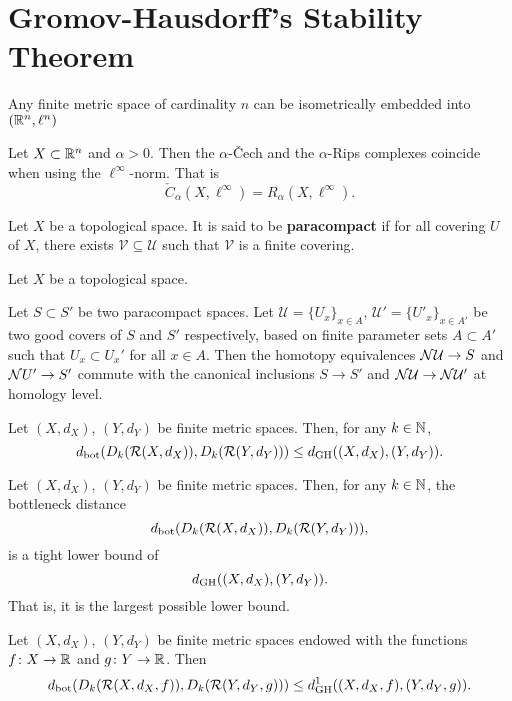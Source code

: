 \chapter{Gromov-Hausdorff's Stability Theorem}

\begin{lemma}
    Any finite metric space of cardinality $ n $ can be isometrically embedded into $(\mathbb R^n, \ell^n)$
\end{lemma}

\begin{lemma}
    Let $ X \subset \mathbb R^n $ and $ \alpha > 0 $. Then the $\alpha$-\v Cech and the $\alpha$-Rips complexes coincide when using the $ \ell^\infty $-norm. That is
    $$
        \check C_\alpha(X, \ell^\infty) = R_\alpha(X, \ell^\infty).
    $$
\end{lemma}

\begin{definition}
    Let $ X $ be a topological space. It is said to be {\bf paracompact} if for all covering $ U $ of $ X $, there exists $ \mathcal V \subseteq \mathcal U $ such that $ \mathcal V $ is a finite covering.
\end{definition}

\begin{definition}
    Let $ X $ be a topological space.
\end{definition}

\begin{lemma}
    Let $ S \subset S' $ be two paracompact spaces. Let $ \mathcal U = \{U_x\}_{x \in A}$, $ \mathcal U' = \{U'_x\}_{x \in A'}$ be two good covers of $ S $ and $ S'$ respectively, based on finite parameter sets $ A \subset A ' $ such that $ U_x \subset U_x' $ for all $ x \in A $. Then the homotopy equivalences $ \mathcal{N} \mathcal U \to S $ and $\mathcal{N} U' \to S' $ commute with the canonical inclusions $ S \to S' $ and $ \mathcal{N} \mathcal U \to \mathcal{N} \mathcal U' $ at homology level.
\end{lemma}

\begin{theorem}
    Let $ (X, d_X) $, $ (Y, d_Y) $ be finite metric spaces. Then, for any $ k \in \mathbb N$, 
    $$
        d_{\operatorname{bot}}(D_k(\mathcal{R}(X, d_X)), D_k(\mathcal{R}(Y, d_Y))) \leq d_{\operatorname{GH}}((X, d_X), (Y, d_Y)).
    $$
\end{theorem}

\begin{proposition}
    Let $ (X, d_X) $, $ (Y, d_Y) $ be finite metric spaces. Then, for any $ k \in \mathbb N$, the bottleneck distance
    $$
        d_{\operatorname{bot}}(D_k(\mathcal{R}(X, d_X)), D_k(\mathcal{R}(Y, d_Y))),
    $$
    is a tight lower bound of
    $$
        d_{\operatorname{GH}}((X, d_X), (Y, d_Y)).
    $$
    That is, it is the largest possible lower bound.
\end{proposition}

\begin{theorem}
    Let $ (X, d_X) $, $ (Y, d_Y) $ be finite metric spaces endowed with the functions $ f \colon X \to \mathbb R $ and $ g \colon Y \to \mathbb R $. Then
    $$
        d_{\operatorname{bot}}(D_k(\mathcal{R}(X, d_X, f)), D_k(\mathcal{R}(Y, d_Y, g))) \leq d_{\operatorname{GH}}^1((X, d_X, f), (Y, d_Y, g)).
    $$
\end{theorem}